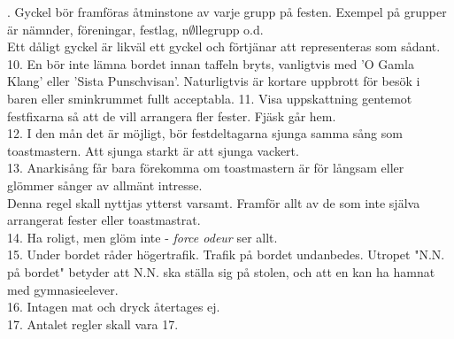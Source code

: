 \documentclass[a6paper, 10pt, twoside]{article}
\begin{document}
. Gyckel bör framföras åtminstone av varje grupp på festen. Exempel på grupper är nämnder, föreningar, festlag, n$\emptyset$llegrupp o.d. \\Ett dåligt gyckel är likväl ett gyckel och förtjänar att representeras som sådant.
\vspace{5pt} \\
10. En bör inte lämna bordet innan taffeln bryts, vanligtvis med 'O Gamla Klang' eller 'Sista Punschvisan'. Naturligtvis är kortare uppbrott för besök i baren eller sminkrummet fullt acceptabla.\vspace{5pt}   
11. Visa uppskattning gentemot festfixarna så att de vill arrangera fler fester. Fjäsk går hem.
\vspace{5pt} \\
12. I den mån det är möjligt, bör festdeltagarna sjunga samma sång som toastmastern. Att sjunga starkt är att sjunga vackert.
\vspace{5pt} \\
13. Anarkisång får bara förekomma om toastmastern är för långsam eller glömmer sånger av allmänt intresse.\\ Denna regel skall nyttjas ytterst varsamt. Framför allt av de som inte själva arrangerat fester eller toastmastrat.
\vspace{5pt} \\
14. Ha roligt, men glöm inte - \textit{force odeur} ser allt.
\vspace{-11pt}
\vspace{5pt}   \\
15. Under bordet råder högertrafik. Trafik på bordet undanbedes. Utropet "N.N. på bordet" betyder att N.N. ska ställa sig på stolen, och att en kan ha hamnat med gymnasieelever.
\vspace{5pt} \\
16. Intagen mat och dryck återtages ej.
\vspace{5pt} \\
17. Antalet regler skall vara 17.
\end{document}
